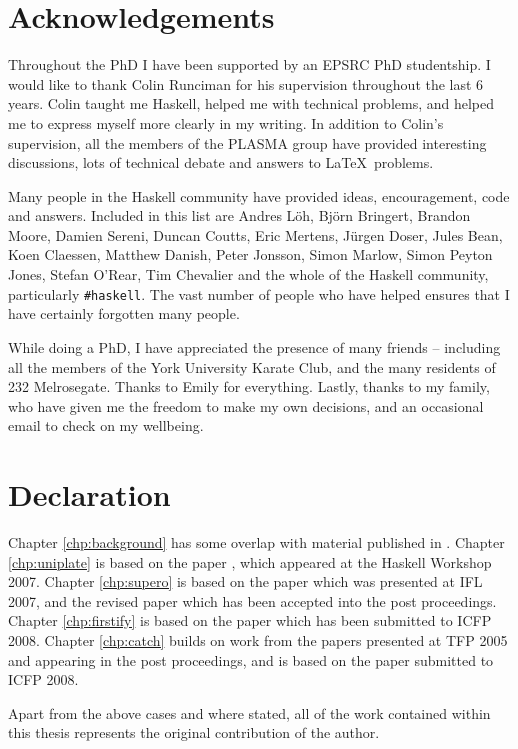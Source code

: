 \tableofcontents
\listoffigures
\listoftables

\chapter*{Acknowledgements}

Throughout the PhD I have been supported by an EPSRC PhD studentship. I would like to thank Colin Runciman for his supervision throughout the last 6 years. Colin taught me Haskell, helped me with technical problems, and helped me to express myself more clearly in my writing. In addition to Colin's supervision, all the members of the PLASMA group have provided interesting discussions, lots of technical debate and answers to \LaTeX\ problems.

Many people in the Haskell community have provided ideas, encouragement, code and answers. Included in this list are Andres L\"{o}h, Bj\"{o}rn Bringert, Brandon Moore, Damien Sereni, Duncan Coutts, Eric Mertens, J\"{u}rgen Doser, Jules Bean, Koen Claessen, Matthew Danish, Peter Jonsson, Simon Marlow, Simon Peyton Jones, Stefan O'Rear, Tim Chevalier and the whole of the Haskell community, particularly \verb"#haskell". The vast number of people who have helped ensures that I have certainly forgotten many people.

While doing a PhD, I have appreciated the presence of many friends -- including all the members of the York University Karate Club, and the many residents of 232 Melrosegate. Thanks to Emily for everything. Lastly, thanks to my family, who have given me the freedom to make my own decisions, and an occasional email to check on my wellbeing.

\chapter*{Declaration}

Chapter \ref{chp:background} has some overlap with material published in \cite{me:yhc_core}. Chapter \ref{chp:uniplate} is based on the paper \cite{me:uniplate}, which appeared at the Haskell Workshop 2007. Chapter \ref{chp:supero} is based on the paper \cite{me:supero_ifl} which was presented at IFL 2007, and the revised paper \cite{me:supero} which has been accepted into the post proceedings. Chapter \ref{chp:firstify} is based on the paper \cite{me:firstify_icfp} which has been submitted to ICFP 2008. Chapter \ref{chp:catch} builds on work from the papers \cite{me:catch_tfp_original,me:catch_tfp} presented at TFP 2005 and appearing in the post proceedings, and is based on the paper \cite{me:catch_icfp} submitted to ICFP 2008.


Apart from the above cases and where stated, all of the work contained within this thesis represents the original contribution of the author.
